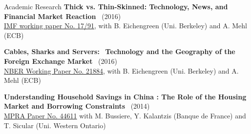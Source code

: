 \documentclass[usegeometry, 10pt, a4paper]{cv} %
\newcommand{\activite}[1]{\textbf{#1}\ }
\begin{document}
\begin{rubriquetableau}[0.95\textwidth]{Academic Research}
\activite{Thick vs. Thin-Skinned: Technology, News, and Financial Market Reaction} (2016) \\
\hspace{0.6cm} \small{\href{https://www.imf.org/en/Publications/WP/Issues/2017/04/07/Thick-vs-44810}{IMF working paper No. 17/91}, with B. Eichengreen (Uni. Berkeley) and A. Mehl (ECB)}
\vspace{0.4cm} 

\activite{Cables, Sharks and Servers:}
\activite{Technology and the Geography of the Foreign Exchange Market} (2016)\\
\hspace{0.6cm} \small{\href{https://www.nber.org/papers/w21884}{NBER Working Paper No. 21884}, with B. Eichengreen (Uni. Berkeley) and A. Mehl (ECB)}
\vspace{0.4cm} 
    
\activite{Understanding Household Savings in China : The Role of the Housing Market and Borrowing Constraints} (2014)  \\
\hspace{0.6cm}
\small{\href{https://ideas.repec.org/p/pra/mprapa/44611.html}{MPRA Paper
    No. 44611} with M. Bussiere, Y. Kalantzis (Banque de France) and T. Sicular (Uni. Western Ontario)}
\end{rubriquetableau}

\vspace{0.8cm}
\end{document}
